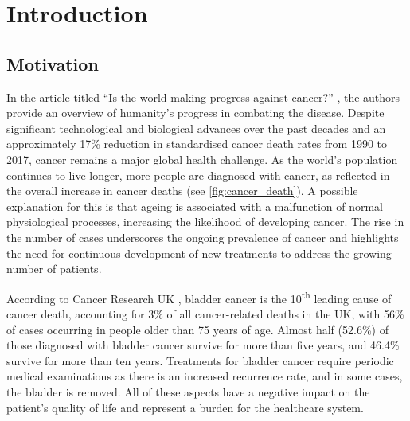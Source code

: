 
\chapter{Introduction}

\vspace{3mm}
\vspace{3mm}


\section{Motivation}


In the article titled “Is the world making progress against cancer?” \citep{Roser2015-qb}, the authors provide an overview of humanity’s progress in combating the disease. Despite significant technological and biological advances over the past decades and an approximately 17\% reduction in standardised cancer death rates from 1990 to 2017, cancer remains a major global health challenge. As the world’s population continues to live longer, more people are diagnosed with cancer, as reflected in the overall increase in cancer deaths (see \cref{fig:cancer_death}). A possible explanation for this is that ageing is associated with a malfunction of normal physiological processes, increasing the likelihood of developing cancer. The rise in the number of cases underscores the ongoing prevalence of cancer and highlights the need for continuous development of new treatments to address the growing number of patients.


According to Cancer Research UK \citeyearpar{Cancer_Research_UK2015-cf}, bladder cancer is the 10\textsuperscript{th} leading cause of cancer death, accounting for 3\% of all cancer-related deaths in the UK, with 56\% of cases occurring in people older than 75 years of age. Almost half (52.6\%) of those diagnosed with bladder cancer survive for more than five years, and 46.4\% survive for more than ten years. Treatments for bladder cancer require periodic medical examinations as there is an increased recurrence rate, and in some cases, the bladder is removed. All of these aspects have a negative impact on the patient’s quality of life and represent a burden for the healthcare system.

